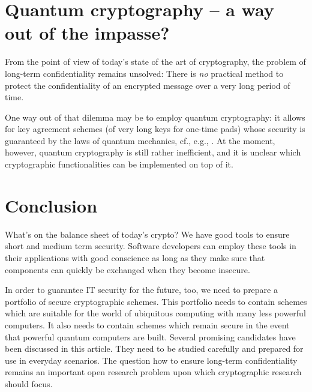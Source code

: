 \section{Quantum cryptography -- a way out of the impasse?}
\label{sec:quantum cryptography}

From the point of view of today's state of the art
of cryptography, the problem of long-term
confidentiality remains unsolved: There is
\emph{no} practical method to protect the
confidentiality of an encrypted message over a
very long period of time.

One way out of that dilemma may be to employ
quantum cryptography: it allows for key agreement
schemes (of very long keys for one-time pads)
whose security is
guaranteed by the laws of quantum mechanics,
cf., e.g., \cite{bennett/brassard:1984b}.  At the
moment, however, quantum cryptography is still
rather inefficient, and it is unclear which
cryptographic functionalities can be implemented
on top of it.


\section{Conclusion}
\label{sec:conclusion}

What's on the balance sheet of today's crypto?  We
have good tools to ensure short and medium term
security.  Software developers can employ these
tools in their applications with good conscience
as long as they make sure that components
can quickly be exchanged when they become
insecure.

In order to guarantee IT security for the future, too,
we need to prepare a portfolio of secure cryptographic
schemes.  This portfolio needs to contain schemes
which are suitable for the world of ubiquitous
computing with many less powerful computers.  It
also needs to contain schemes which remain secure
in the event that powerful quantum computers are
built.  Several promising candidates have been
discussed in this article.  They need to be
studied carefully and prepared for use in everyday
scenarios.  The question how to ensure long-term
confidentiality remains an important open research
problem upon which cryptographic research should
focus.

\putbib

